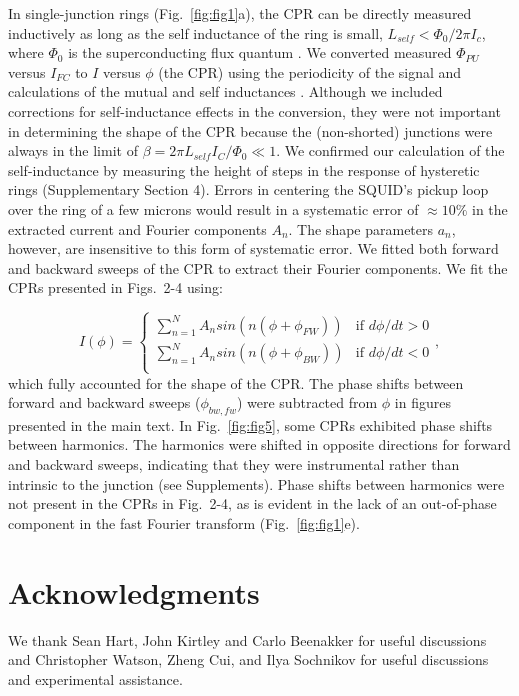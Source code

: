 \documentclass[11pt]{article}
\begin{document}
In single-junction rings (Fig.~\ref{fig:fig1}a), the CPR can be directly measured inductively as long as the self inductance of the ring is small, $L_{self} < \Phi_0 / 2 \pi I_c$, where $\Phi_0$ is the superconducting flux quantum .
We converted measured $\Phi_{PU}$ versus $I_{FC}$ to $I$ versus $\phi$ (the CPR) using the periodicity of the signal and calculations of the mutual and self inductances . Although we included corrections for self-inductance effects in the conversion, they were not important in determining the shape of the CPR because the (non-shorted) junctions were always in the limit of $\beta = 2 \pi L_{self} I_C / \Phi_0 \ll 1$. We confirmed our calculation of the self-inductance by measuring the height of steps in the response of hysteretic rings (Supplementary Section 4). Errors in centering the SQUID's pickup loop over the ring of a few microns would result in a systematic error of $\approx 10\%$ in the extracted current and Fourier components $A_n$. The shape parameters $a_n$, however, are insensitive to this form of systematic error.
We fitted both forward and backward sweeps of the CPR to extract their Fourier components. We fit the CPRs presented in Figs.~2-4 using:

\begin{equation}\label{eq:fixed_fits}
I(\phi) = \begin{cases} \sum_{n=1}^N A_n sin (n (\phi + \phi_{FW})) &\mbox{if }d\phi/dt > 0 \\ 
\sum_{n=1}^N A_n sin (n (\phi + \phi_{BW})) &\mbox{if } d\phi/dt < 0 \\ 
\end{cases}, 
\end{equation} which fully accounted for the shape of the CPR. The phase shifts between forward and backward sweeps ($\phi_{bw,fw}$) were subtracted from $\phi$ in figures presented in the main text.
In Fig.~\ref{fig:fig5}, some CPRs exhibited phase shifts between harmonics. The harmonics were shifted in opposite directions for forward and backward sweeps, indicating that they were instrumental rather than intrinsic to the junction (see Supplements). Phase shifts between harmonics were not present in the CPRs in Fig.~2-4, as is evident in the lack of an out-of-phase component in the fast Fourier transform (Fig.~\ref{fig:fig1}e).

\FloatBarrier

\section{Acknowledgments}
We thank Sean Hart, John Kirtley and Carlo Beenakker for useful discussions and Christopher Watson, Zheng Cui, and Ilya Sochnikov for useful discussions and experimental assistance.
\end{document}
